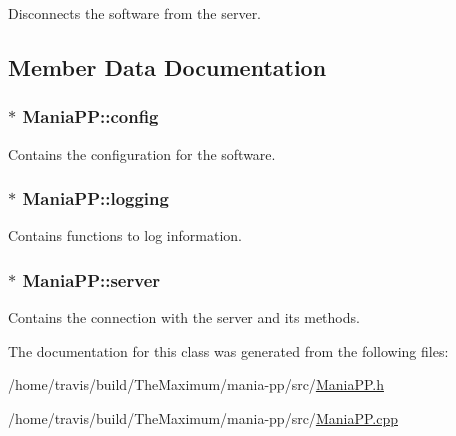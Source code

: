 Disconnects the software from the server. 



\subsection{Member Data Documentation}
\hypertarget{classManiaPP_a9a91437fa70afd52c2dce19298888e36}{
\subsubsection[{config}]{$\ast$ Mania\-P\-P\-::config\hspace{0.3cm}{\ttfamily [private]}}}\label{classManiaPP_a9a91437fa70afd52c2dce19298888e36}


Contains the configuration for the software. 

\hypertarget{classManiaPP_aa4cea090301bdf0bf652ad377e7b01c0}{
\subsubsection[{logging}]{$\ast$ Mania\-P\-P\-::logging\hspace{0.3cm}{\ttfamily [private]}}}\label{classManiaPP_aa4cea090301bdf0bf652ad377e7b01c0}


Contains functions to log information. 

\hypertarget{classManiaPP_ab81311d6901990cb99a7a30e0cbaab11}{
\subsubsection[{server}]{$\ast$ Mania\-P\-P\-::server\hspace{0.3cm}{\ttfamily [private]}}}\label{classManiaPP_ab81311d6901990cb99a7a30e0cbaab11}


Contains the connection with the server and its methods. 



The documentation for this class was generated from the following files\-:\begin{DoxyCompactItemize}
\item 
/home/travis/build/\-The\-Maximum/mania-\/pp/src/\hyperlink{ManiaPP_8h}{Mania\-P\-P.\-h}\item 
/home/travis/build/\-The\-Maximum/mania-\/pp/src/\hyperlink{ManiaPP_8cpp}{Mania\-P\-P.\-cpp}\end{DoxyCompactItemize}
